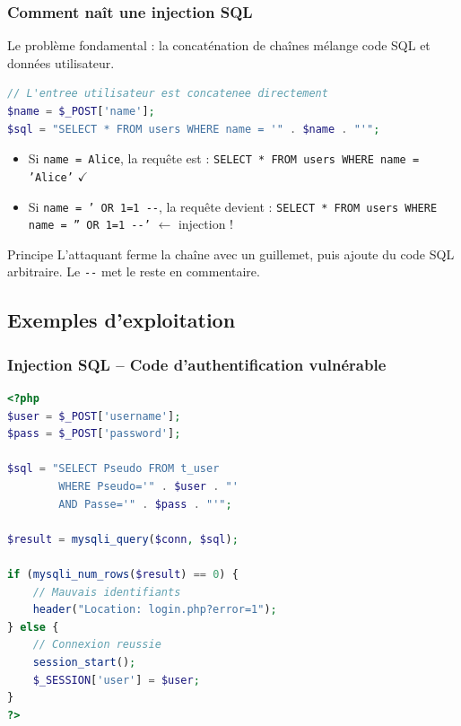 \documentclass{beamer}
\def\emptyline{\vspace{10pt}}
\begin{document}
\begin{frame}[fragile]
\frametitle{Comment naît une injection SQL}

Le problème fondamental : la \alert{concaténation de chaînes} mélange code SQL et données utilisateur.

\begin{lstlisting}[language=PHP,title={\texttt{Construction dangereuse d'une requête}}]
// L'entree utilisateur est concatenee directement
$name = $_POST['name'];
$sql = "SELECT * FROM users WHERE name = '" . $name . "'";
\end{lstlisting}

\begin{itemize}
\item Si \texttt{name = Alice}, la requête est : \texttt{SELECT * FROM users WHERE name = 'Alice'} $\checkmark$
\item Si \texttt{name = ' OR 1=1 -{}-}, la requête devient : \texttt{SELECT * FROM users WHERE name = '' OR 1=1 -{}-'} $\leftarrow$ \alert{injection !}
\end{itemize}

\emptyline
\begin{alertblock}{Principe}
L'attaquant \alert{ferme la chaîne} avec un guillemet, puis ajoute du code SQL arbitraire. Le \texttt{-{}-} met le reste en commentaire.
\end{alertblock}
\end{frame}


\subsection{Exemples d'exploitation}

\begin{frame}[fragile]
\frametitle{Injection SQL -- Code d'authentification vulnérable}

\begin{lstlisting}[language=PHP,title={\texttt{login.php -- Authentification vulnérable}}]
<?php
$user = $_POST['username'];
$pass = $_POST['password'];

$sql = "SELECT Pseudo FROM t_user
        WHERE Pseudo='" . $user . "'
        AND Passe='" . $pass . "'";

$result = mysqli_query($conn, $sql);

if (mysqli_num_rows($result) == 0) {
    // Mauvais identifiants
    header("Location: login.php?error=1");
} else {
    // Connexion reussie
    session_start();
    $_SESSION['user'] = $user;
}
?>
\end{lstlisting}
\end{frame}
\end{document}
